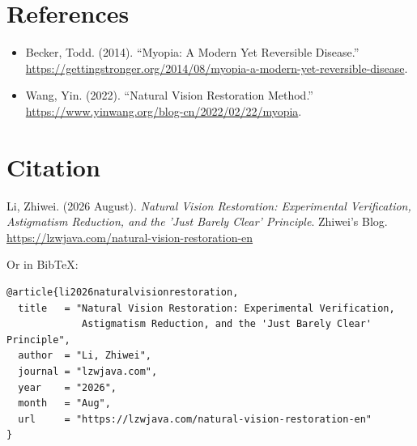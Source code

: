 \documentclass[12pt]{article}
\begin{document}
\section*{References}
\begin{itemize}
    \item Becker, Todd. (2014). ``Myopia: A Modern Yet Reversible Disease.'' \url{https://gettingstronger.org/2014/08/myopia-a-modern-yet-reversible-disease}.
    \item Wang, Yin. (2022). ``Natural Vision Restoration Method.'' \url{https://www.yinwang.org/blog-cn/2022/02/22/myopia}.
\end{itemize}

\section*{Citation}
Li, Zhiwei. (2026 August). \textit{Natural Vision Restoration: Experimental Verification, Astigmatism Reduction, and the 'Just Barely Clear' Principle}. Zhiwei's Blog. \url{https://lzwjava.com/natural-vision-restoration-en}

Or in BibTeX:
\begin{verbatim}
@article{li2026naturalvisionrestoration,
  title   = "Natural Vision Restoration: Experimental Verification,
             Astigmatism Reduction, and the 'Just Barely Clear' Principle",
  author  = "Li, Zhiwei",
  journal = "lzwjava.com",
  year    = "2026",
  month   = "Aug",
  url     = "https://lzwjava.com/natural-vision-restoration-en"
}
\end{verbatim}
\end{document}
